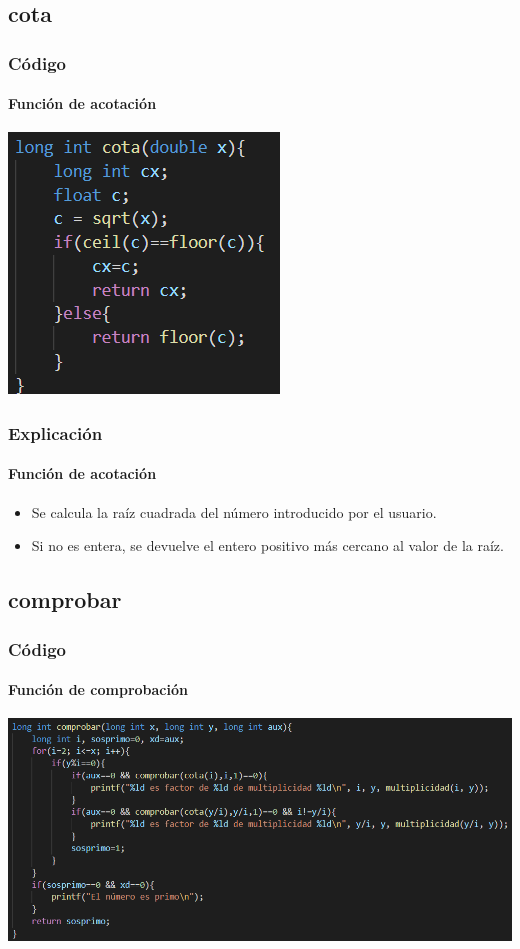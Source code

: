 \documentclass{beamer}
\begin{document}
\subsection[cota]{cota}

\begin{frame}
  \frametitle{C\'odigo}
  \framesubtitle{Funci\'on de acotaci\'on}
  \begin{center}
 \includegraphics[scale=1]{cota}
\end{center}
\end{frame}

\begin{frame}
  \frametitle{Explicaci\'on}
  \framesubtitle{Funci\'on de acotaci\'on}
  \begin{itemize}[<+->] %
  \item Se calcula la ra\'{i}z cuadrada del n\'umero introducido por el usuario.
  \item Si no es entera, se devuelve el entero positivo m\'as cercano al valor de la ra\'{i}z.
  \end{itemize}
\end{frame}

\subsection[comprobar]{comprobar}

\begin{frame}
  \frametitle{C\'odigo}
  \framesubtitle{Funci\'on de comprobaci\'on}
  \begin{center}
 \includegraphics[scale=0.5]{comprobar}
\end{center}
\end{frame}
\end{document}
